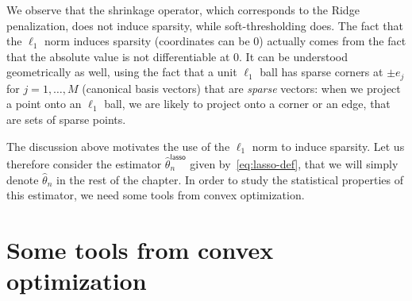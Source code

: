 \documentclass[
	fontsize=11pt, %
	twoside=false, %
	numbers=noenddot, %
]{kaobook}
\newcommand{\wh}{\widehat}
\begin{document}
We observe that the shrinkage operator, which corresponds to the Ridge penalization, does not induce sparsity, while soft-thresholding does.
The fact that the $\ell_1$ norm induces sparsity (coordinates can be 0) actually comes from the fact that the absolute value is not differentiable at $0$.
It can be understood geometrically as well, using the fact that a unit $\ell_1$ ball has sparse corners at $\pm e_j$ for $j=1, \ldots, M$ (canonical basis vectors) that are \emph{sparse} vectors: when we project a point onto an $\ell_1$ ball, we are likely to project onto a corner or an edge, that are sets of sparse points.


The discussion above motivates the use of the $\ell_1$ norm to induce sparsity.
Let us therefore consider the estimator $\wh \theta_n^{\mathsf{lasso}}$ given by~\eqref{eq:lasso-def}, that we will simply denote $\wh \theta_n$ in the rest of the chapter.
In order to study the statistical properties of this estimator, we need some tools from convex optimization.



\section{Some tools from convex optimization} %
\label{sec:some_tools_from_convex_optimization}
\end{document}
